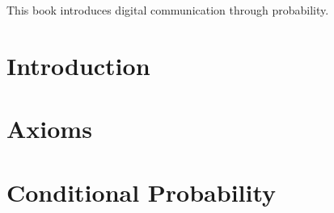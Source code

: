 \documentclass[11pt]{book}
\begin{document}

\setcounter{page}{1}

\begin{introduction}
This book introduces digital communication through probability.

\end{introduction}

\mainmatter

\chapter{Introduction}
%
\chapter{Axioms}

\chapter{Conditional Probability}

\end{document}
